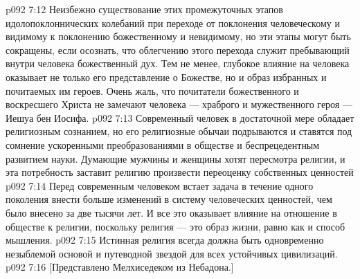 \vs p092 7:12 Неизбежно существование этих промежуточных этапов идолопоклоннических колебаний при переходе от поклонения человеческому и видимому к поклонению божественному и невидимому, но эти этапы могут быть сокращены, если осознать, что облегчению этого перехода служит пребывающий внутри человека божественный дух. Тем не менее, глубокое влияние на человека оказывает не только его представление о Божестве, но и образ избранных и почитаемых им героев. Очень жаль, что почитатели божественного и воскресшего Христа не замечают человека --- храброго и мужественного героя --- Иешуа бен Иосифа.
\vs p092 7:13 \pc Современный человек в достаточной мере обладает религиозным сознанием, но его религиозные обычаи подрываются и ставятся под сомнение ускоренными преобразованиями в обществе и беспрецедентным развитием науки. Думающие мужчины и женщины хотят пересмотра религии, и эта потребность заставит религию произвести переоценку собственных ценностей
\vs p092 7:14 Перед современным человеком встает задача в течение одного поколения внести больше изменений в систему человеческих ценностей, чем было внесено за две тысячи лет. И все это оказывает влияние на отношение в обществе к религии, поскольку религия --- это образ жизни, равно как и способ мышления.
\vs p092 7:15 \pc Истинная религия всегда должна быть одновременно незыблемой основой и путеводной звездой для всех устойчивых цивилизаций.
\vsetoff
\vs p092 7:16 [Представлено Мелхиседеком из Небадона.]
